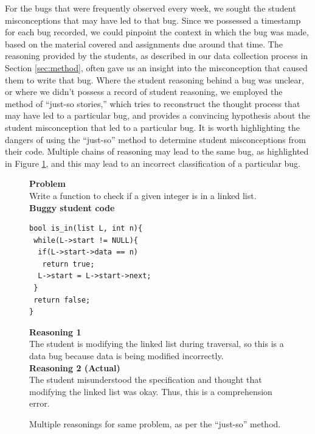 \documentclass{sig-alternate}
\begin{document}
For the bugs that were frequently observed every week, we sought the student misconceptions that may have led to that bug. Since we possessed a timestamp for each bug recorded, we could pinpoint the context in which the bug was made, based on the material covered and assignments due around that time. The reasoning provided by the students, as described in our data collection process in Section \ref{sec:method}, often gave us an insight into the misconception that caused them to write that bug. Where the student reasoning behind a bug was unclear, or where we didn't possess a record of student reasoning, we employed the method of ``just-so stories,'' \cite{JoniSolowayGoldmanEhrlich83} which tries to reconstruct the thought process that may have led to a particular bug, and provides a convincing hypothesis about the student misconception that led to a particular bug. It is worth highlighting the dangers of using the ``just-so'' method to determine student misconceptions from their code. Multiple chains of reasoning may lead to the same bug, as highlighted in Figure \ref{fig:incorrect}, and this may lead to an incorrect classification of a particular bug.\\

\begin{figure}
\begin{framed}
\setlength{\parindent}{0cm}
\textbf{Problem}\\
Write a function to check if a given integer is in a linked list.\\

\textbf{Buggy student code}
\begin{verbatim}
bool is_in(list L, int n){
 while(L->start != NULL){
  if(L->start->data == n)
   return true;
  L->start = L->start->next;
 }
 return false;
}
\end{verbatim}

\textbf{Reasoning 1}\\
The student is modifying the linked list during traversal, so this is a data bug because data is being modified incorrectly.\\

\textbf{Reasoning 2 (Actual)}\\
The student misunderstood the specification and thought that modifying the linked list was okay. Thus, this is a comprehension error.
\end{framed}
\caption{Multiple reasonings for same problem, as per the ``just-so'' method.}
\label{fig:incorrect}
\end{figure}
\end{document}
